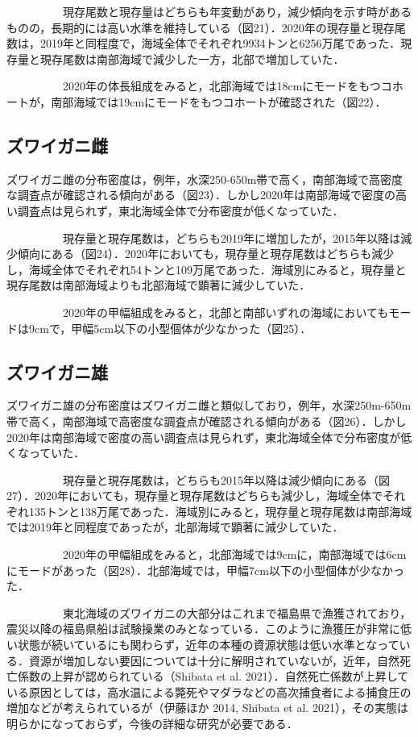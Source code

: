 \documentclass[11pt]{article} %
\begin{document}
\begin{linenumbers}
\ \ \ \ \ \ \ \ \ \ 
現存尾数と現存量はどちらも年変動があり，減少傾向を示す時があるものの，長期的には高い水準を維持している（図21）．2020年の現存量と現存尾数は，2019年と同程度で，海域全体でそれぞれ9934トンと6256万尾であった．現存量と現存尾数は南部海域で減少した一方，北部で増加していた．

\ \ \ \ \ \ \ \ \ \ 
2020年の体長組成をみると，北部海域では18cmにモードをもつコホートが，南部海域では19cmにモードをもつコホートが確認された（図22）．


\subsection{ズワイガニ雌}
ズワイガニ雌の分布密度は，例年，水深250-650m帯で高く，南部海域で高密度な調査点が確認される傾向がある（図23）．しかし2020年は南部海域で密度の高い調査点は見られず，東北海域全体で分布密度が低くなっていた．

\ \ \ \ \ \ \ \ \ \ 
現存量と現存尾数は，どちらも2019年に増加したが，2015年以降は減少傾向にある（図24）．2020年においても，現存量と現存尾数はどちらも減少し，海域全体でそれぞれ54トンと109万尾であった．海域別にみると，現存量と現存尾数は南部海域よりも北部海域で顕著に減少していた．

\ \ \ \ \ \ \ \ \ \ 
2020年の甲幅組成をみると，北部と南部いずれの海域においてもモードは9cmで，甲幅5cm以下の小型個体が少なかった（図25）．


\subsection{ズワイガニ雄}
ズワイガニ雄の分布密度はズワイガニ雌と類似しており，例年，水深250m-650m帯で高く，南部海域で高密度な調査点が確認される傾向がある（図26）．しかし2020年は南部海域で密度の高い調査点は見られず，東北海域全体で分布密度が低くなっていた．

\ \ \ \ \ \ \ \ \ \ 
現存量と現存尾数は，どちらも2015年以降は減少傾向にある（図27）．2020年においても，現存量と現存尾数はどちらも減少し，海域全体でそれぞれ135トンと138万尾であった．海域別にみると，現存量と現存尾数は南部海域では2019年と同程度であったが，北部海域で顕著に減少していた．

\ \ \ \ \ \ \ \ \ \ 
2020年の甲幅組成をみると，北部海域では9cmに，南部海域では6cmにモードがあった（図28）．北部海域では，甲幅7cm以下の小型個体が少なかった．

\ \ \ \ \ \ \ \ \ \ 
東北海域のズワイガニの大部分はこれまで福島県で漁獲されており，震災以降の福島県船は試験操業のみとなっている．このように漁獲圧が非常に低い状態が続いているにも関わらず，近年の本種の資源状態は低い水準となっている．資源が増加しない要因については十分に解明されていないが，近年，自然死亡係数の上昇が認められている（Shibata et al. 2021）．自然死亡係数が上昇している原因としては，高水温による斃死やマダラなどの高次捕食者による捕食圧の増加などが考えられているが（伊藤ほか 2014, Shibata et al. 2021），その実態は明らかになっておらず，今後の詳細な研究が必要である．



\end{linenumbers}
\end{document}
